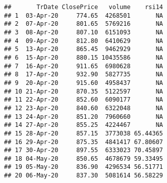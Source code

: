 \documentclass[
]{article}
\newenvironment{Shaded}{\begin{snugshade}}{\end{snugshade}}
\newcommand{\CommentTok}[1]{\textcolor[rgb]{0.56,0.35,0.01}{\textit{#1}}}
\newcommand{\DataTypeTok}[1]{\textcolor[rgb]{0.13,0.29,0.53}{#1}}
\newcommand{\DecValTok}[1]{\textcolor[rgb]{0.00,0.00,0.81}{#1}}
\newcommand{\KeywordTok}[1]{\textcolor[rgb]{0.13,0.29,0.53}{\textbf{#1}}}
\newcommand{\NormalTok}[1]{#1}
\newcommand{\OperatorTok}[1]{\textcolor[rgb]{0.81,0.36,0.00}{\textbf{#1}}}
\begin{document}
\begin{Shaded}
\end{Shaded}

\begin{verbatim}
##       TrDate ClosePrice   volume    rsi14
## 1  03-Apr-20     774.65  4268501       NA
## 2  07-Apr-20     801.65  5769216       NA
## 3  08-Apr-20     807.10  6151093       NA
## 4  09-Apr-20     812.80  6410629       NA
## 5  13-Apr-20     865.45  9462929       NA
## 6  15-Apr-20     880.15 10435586       NA
## 7  16-Apr-20     911.65  6980628       NA
## 8  17-Apr-20     932.90  5827735       NA
## 9  20-Apr-20     915.60  4958437       NA
## 10 21-Apr-20     870.35  5122597       NA
## 11 22-Apr-20     852.60  6090177       NA
## 12 23-Apr-20     840.60  6322048       NA
## 13 24-Apr-20     851.20  7960660       NA
## 14 27-Apr-20     855.25  4224467       NA
## 15 28-Apr-20     857.15  3773038 65.44365
## 16 29-Apr-20     875.35  4841417 67.80607
## 17 30-Apr-20     897.55  6333023 70.45897
## 18 04-May-20     850.65  4678679 59.33495
## 19 05-May-20     836.90  4296534 56.51771
## 20 06-May-20     837.30  5081614 56.58229
\end{verbatim}
\end{document}
